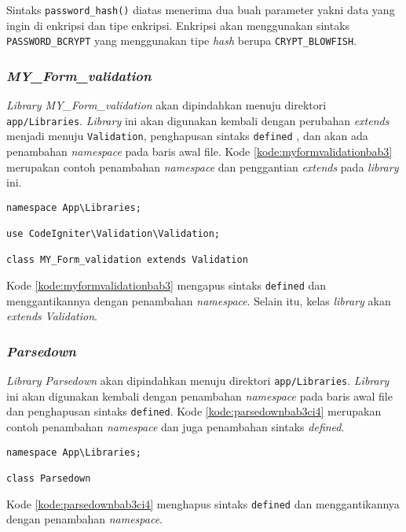 Sintaks \texttt{password\_hash()} diatas menerima dua buah parameter yakni data yang ingin di enkripsi dan tipe enkripsi. Enkripsi akan menggunakan sintaks \texttt{PASSWORD\_BCRYPT} yang menggunakan tipe \textit{hash} berupa \texttt{CRYPT\_BLOWFISH}.

\subsubsection{\textit{MY\_Form\_validation}}
\textit{Library MY\_Form\_validation} akan dipindahkan menuju direktori \texttt{app/Libraries}. \textit{Library} ini akan digunakan kembali dengan perubahan \textit{extends} menjadi menuju \texttt{Validation}, penghapusan sintaks \texttt{defined} , dan akan ada penambahan \textit{namespace} pada baris awal file. Kode \ref{kode:myformvalidationbab3} merupakan contoh penambahan \textit{namespace} dan penggantian \textit{extends} pada \textit{library} ini.
\begin{lstlisting}[caption=Contoh perubahan \textit{library MY\_Form\_validation} pada \textit{CodeIgniter 4}, label=kode:myformvalidationbab3]
namespace App\Libraries;

use CodeIgniter\Validation\Validation;

class MY_Form_validation extends Validation
\end{lstlisting}
Kode \ref{kode:myformvalidationbab3} mengapus sintaks \texttt{defined} dan menggantikannya dengan penambahan \textit{namespace}. Selain itu, kelas \textit{library} akan \textit{extends} \textit{Validation}.

\subsubsection{\textit{Parsedown}}
\textit{Library Parsedown} akan dipindahkan menuju direktori \texttt{app/Libraries}. \textit{Library} ini akan digunakan kembali dengan penambahan \textit{namespace} pada baris awal file dan penghapusan sintaks \texttt{defined}.  Kode \ref{kode:parsedownbab3ci4} merupakan contoh penambahan \textit{namespace} dan juga penambahan sintaks \textit{defined}.
\begin{lstlisting}[caption=Contoh perubahan \textit{library Parsedown} pada \textit{CodeIgniter 4}, label=kode:parsedownbab3ci4]
namespace App\Libraries;

class Parsedown
\end{lstlisting}
Kode \ref{kode:parsedownbab3ci4} menghapus sintaks \texttt{defined} dan menggantikannya dengan penambahan \textit{namespace}.
